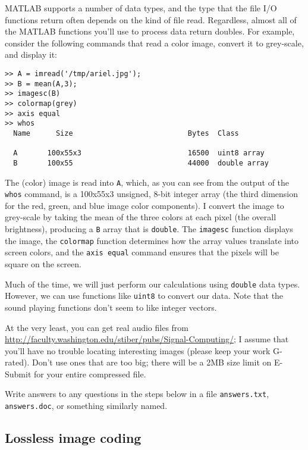 MATLAB supports a number of data types, and the type that the file I/O
functions return often depends on the kind of file read. Regardless,
almost all of the MATLAB functions you'll use to process data return
doubles. For example, consider the following commands that read a
color image, convert it to grey-scale, and display it:
\begin{verbatim}
>> A = imread('/tmp/ariel.jpg');
>> B = mean(A,3);
>> imagesc(B)
>> colormap(grey)
>> axis equal
>> whos
  Name      Size                           Bytes  Class

  A       100x55x3                         16500  uint8 array
  B       100x55                           44000  double array
\end{verbatim}
The (color) image is read into \texttt{A}, which, as you can see from
the output of the \texttt{whos} command, is a 100x55x3 unsigned, 8-bit
integer array (the third dimension for the red, green, and blue image
color components). I convert the image to grey-scale by taking the
mean of the three colors at each pixel (the overall brightness),
producing a \texttt{B} array that is \texttt{double}. The
\texttt{imagesc} function displays the image, the \texttt{colormap}
function determines how the array values translate into screen colors,
and the \texttt{axis equal} command ensures that the pixels will be
square on the screen.

Much of the time, we will just perform our calculations using
\texttt{double} data types. However, we can use functions like
\texttt{uint8} to convert our data. Note that the sound playing
functions don't seem to like integer vectors.

At the very least, you can get real audio files from
\url{http://faculty.washington.edu/stiber/pubs/Signal-Computing/}; I assume that
you'll have no trouble locating interesting images (please keep your
work G-rated). Don't use ones that are too big; there will be a 2MB
size limit on E-Submit for your entire compressed file.

Write answers to any questions in the steps below in a file
\texttt{answers.txt}, \texttt{answers.doc}, or something similarly
named.

\subsection{Lossless image coding}

